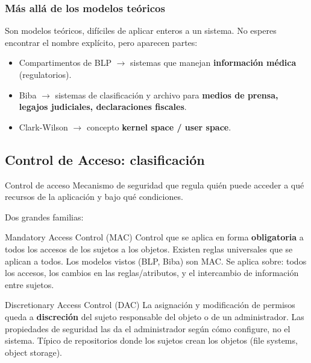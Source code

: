\documentclass[../main.tex]{subfiles}
\begin{document}
\subsubsection{Más allá de los modelos teóricos}

Son modelos teóricos, difíciles de aplicar enteros a un sistema. No esperes encontrar el nombre explícito, pero aparecen partes:
\begin{itemize}[nosep]
  \item Compartimentos de BLP $\rightarrow$ sistemas que manejan \textbf{información médica} (regulatorios).
  \item Biba $\rightarrow$ sistemas de clasificación y archivo para \textbf{medios de prensa, legajos judiciales, declaraciones fiscales}.
  \item Clark-Wilson $\rightarrow$ concepto \textbf{kernel space / user space}.
\end{itemize}

\subsection{Control de Acceso: clasificación}

\begin{definicion}{Control de acceso}
Mecanismo de seguridad que regula quién puede acceder a qué recursos de la aplicación y bajo qué condiciones.
\end{definicion}

Dos grandes familias:

\begin{definicion}{Mandatory Access Control (MAC)}
Control que se aplica en forma \textbf{obligatoria} a todos los accesos de los sujetos a los objetos. Existen reglas universales que se aplican a todos. Los modelos vistos (BLP, Biba) son MAC. Se aplica sobre: todos los accesos, los cambios en las reglas/atributos, y el intercambio de información entre sujetos.
\end{definicion}

\begin{definicion}{Discretionary Access Control (DAC)}
La asignación y modificación de permisos queda a \textbf{discreción} del sujeto responsable del objeto o de un administrador. Las propiedades de seguridad las da el administrador según cómo configure, no el sistema. Típico de repositorios donde los sujetos crean los objetos (file systems, object storage).
\end{definicion}
\end{document}
